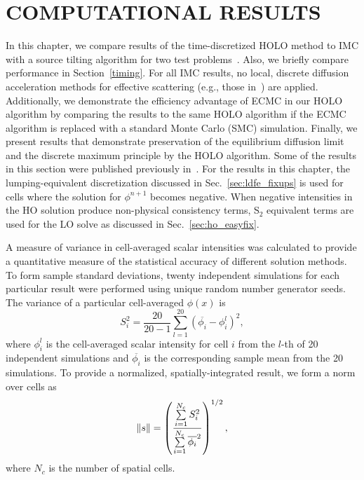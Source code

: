 
\chapter{\uppercase{Computational Results}}
\label{chp:results}

In this chapter, we compare results of the time-discretized HOLO method to IMC with
a source tilting algorithm for two test problems~\cite{jayenne}.  Also, we
briefly compare performance in Section~\ref{timing}.  For all IMC results, no
local, discrete diffusion acceleration methods for effective scattering
(e.g., those in~\cite{imd,ddmc}) are applied.  Additionally, we demonstrate
the efficiency advantage of ECMC in our HOLO algorithm by comparing the results
to the same HOLO algorithm if the ECMC algorithm is replaced with a standard
Monte Carlo (SMC) simulation.  Finally, we present results that demonstrate
preservation of the equilibrium diffusion limit and the discrete maximum
principle by the HOLO algorithm.  Some of the results in this section were published
previously in~\cite{bolding_nse}.  
For the results in this chapter, the lumping-equivalent discretization
discussed in Sec.~\ref{sec:ldfe_fixups} is used for cells where the solution for
$\phi^{n+1}$ becomes negative.  When negative intensities in the HO solution produce
non-physical consistency terms, S$_2$ equivalent terms are used for the LO solve as
discussed in Sec.~\ref{sec:ho_easyfix}.

A measure of variance in cell-averaged scalar intensities was
calculated to provide a quantitative measure of the statistical accuracy of different solution
methods.  To form sample standard deviations, twenty independent simulations for each
particular result were performed using unique random number generator seeds.
The variance of a particular cell-averaged $\phi(x)$ is 
\begin{equation} 
    S_i^2 =  \frac{20}{20-1} \sum_{l=1}^{20} \left(\overline{\phi_{i}} -
    \phi_{i}^l\right)^2,
\end{equation}
where $\phi_{i}^l$ is the cell-averaged scalar intensity for cell $i$ from the $l$-th of 20 independent simulations and
$\overline{\phi_{i}}$ is the corresponding sample mean from the 20 simulations. To
provide a normalized, spatially-integrated result, we form a norm over cells as 
\begin{equation}
    \ss = \left({\frac{\sum\limits_{i=1}^{N_c}
S_i^2}{\sum\limits_{i=1}^{N_c}\overline{\phi_{i}}^2}}\right)^{1/2},
\end{equation}
where $N_c$ is the number of spatial cells. 

